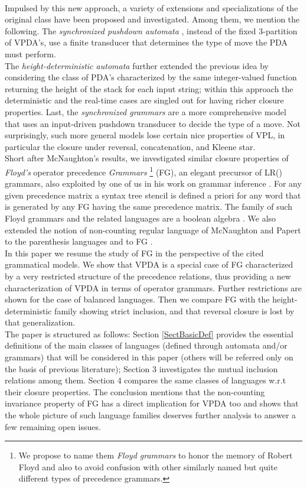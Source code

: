 \documentclass[3p,11pt]{elsarticle}
\begin{document}
\\
Impulsed by this new approach, a variety of extensions and specializations of the original class have been proposed and investigated. Among them, we mention the following.
 The \emph{synchronized pushdown automata} \cite{conf/dlt/Caucal06}, instead of the fixed 3-partition of VPDA's, use
 a finite transducer that determines the type of move the PDA must perform.
\\
 The \emph{height-deterministic automata} \cite{conf/mfcs/NowotkaS07} further extended the previous idea by considering the class of PDA's characterized by the same integer-valued function returning the height of the stack for each input string; within this approach the deterministic and the real-time cases are singled out for having richer closure properties.
 Last, the \emph{synchronized grammars} \cite{caucal:DSP:2008:1743} are a more comprehensive model
 that uses an input-driven pushdown transducer to decide the type of a move. Not surprisingly, such more general models lose certain nice properties of VPL, in particular the closure under reversal, concatenation, and Kleene star.
\\
Short after McNaughton's results, we investigated similar closure properties of \emph{Floyd's} operator precedence \emph{Grammars} \cite{Floyd1963} \footnote{We propose to name them \emph{Floyd grammars} to honor the memory of Robert Floyd and also to avoid confusion with other similarly named but quite different types of precedence grammars.} (FG), an elegant precursor of LR() grammars, also exploited by one of us in his work on grammar inference \cite{crespi-72}. For any given precedence matrix a syntax tree stencil is defined a priori for any word that is generated by any FG having the same precedence matrix. The family of such Floyd grammars and the related languages are a boolean algebra \cite{Crespi-ReghizziMM1978}. We also extended the notion of non-counting regular language of McNaughton and Papert \cite{McNaughtPap71} to the parenthesis languages \cite{CreGuiMan78} and to FG \cite{CreGuiMan81}.
\\
In this paper we resume the study of FG in the perspective of the cited grammatical models. We show that VPDA is a special case of FG characterized by a very restricted structure of the precedence relations, thus providing a new characterization of VPDA in terms of operator grammars. Further restrictions are shown for the case of balanced languages. Then we compare FG with the height-deterministic family showing strict inclusion, and that reversal closure is lost by that generalization.
\\
The paper is structured as follows: Section \ref{SectBasicDef} provides the essential definitions of the main classes of languages (defined through automata and/or grammars) that will be considered in this paper (others will be referred only on the basis of previous literature); Section 3 investigates the mutual inclusion relations among them. Section 4 compares the same classes of languages w.r.t their closure properties. The conclusion mentions that the non-counting invariance property of FG has a direct implication for VPDA too and shows that the whole picture of such language families deserves further analysis to answer a few remaining open issues.
\end{document}

